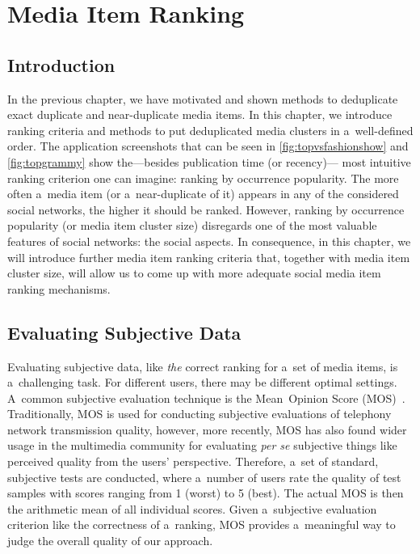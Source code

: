 \chapter{Media Item Ranking}
\label{sec:media-item-ranking}

\ifpdf
    \graphicspath{{7_media_item_ranking/figures/PNG/}{7_media_item_ranking/figures/PDF/}{7_media_item_ranking/figures/}}
\else
    \graphicspath{{7_media_item_ranking/figures/EPS/}{7_media_item_ranking/figures/}}
\fi

\section{Introduction}

In the previous chapter, we have motivated and shown methods
to deduplicate exact duplicate and near-duplicate media items.
In this chapter, we introduce ranking criteria and methods
to put deduplicated media clusters in a~well-defined order.
The application screenshots that can be seen in \autoref{fig:topvsfashionshow}
and \autoref{fig:topgrammy} show the---besides publication time (or recency)---%
most intuitive ranking criterion one can imagine:
ranking by occurrence popularity.
The more often a~media item (or a~near-duplicate of it)
appears in any of the considered social networks, 
the higher it should be ranked.
However, ranking by occurrence popularity (or media item cluster size)
disregards one of the most valuable features of social networks: 
the social aspects.
In consequence, in this chapter, we will introduce
further media item ranking criteria that,
together with media item cluster size,
will allow us to come up with more adequate social media item ranking mechanisms.

\section{Evaluating Subjective Data}

Evaluating subjective data, like \emph{the} correct ranking
for a~set of media items, is a~challenging task.
For different users, there may be different optimal settings.
A~common subjective evaluation technique
is the Mean~Opinion Score (MOS)~\cite{itu1998mos}.
Traditionally, MOS is used for conducting subjective evaluations
of telephony network transmission quality,
however, more recently, MOS has also found
wider usage in the multimedia community
for evaluating \emph{per se} subjective things
like perceived quality from the users' perspective. 
Therefore, a~set of standard, subjective tests are conducted,
where a~number of users rate the quality of test samples
with scores ranging from 1 (worst) to 5 (best).
The actual MOS is then the arithmetic mean of all individual scores.
Given a~subjective evaluation criterion
like the correctness of a~ranking,
MOS provides a~meaningful way to judge the overall quality of our approach.

